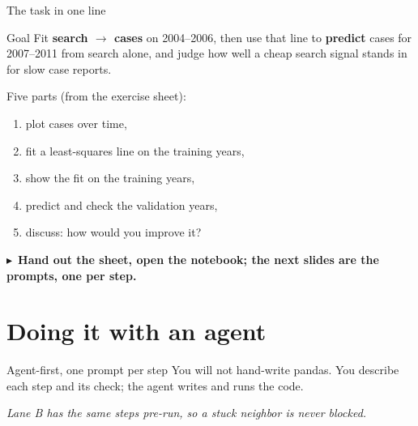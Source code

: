 \documentclass[aspectratio=169,11pt]{beamer}
\newcommand{\tonb}[1]{\vspace{0.1em}\begin{flushright}\footnotesize\textcolor{AccentB}{$\blacktriangleright$~\textbf{#1}}\end{flushright}}
\begin{document}
\begin{frame}{The task in one line}
  \begin{block}{Goal}
    Fit \textbf{search $\rightarrow$ cases} on 2004--2006, then use that line to
    \textbf{predict} cases for 2007--2011 from search alone, and judge how well a cheap
    search signal stands in for slow case reports.
  \end{block}
  \vspace{0.5em}
  Five parts (from the exercise sheet):
  \begin{enumerate}
    \item plot cases over time,
    \item fit a least-squares line on the training years,
    \item show the fit on the training years,
    \item predict and check the validation years,
    \item discuss: how would you improve it?
  \end{enumerate}
  \tonb{Hand out the sheet, open the notebook; the next slides are the prompts, one per step.}
\end{frame}

\section{Doing it with an agent}

\begin{frame}{Agent-first, one prompt per step}
  You will not hand-write pandas. You describe each step and its check; the agent writes
  and runs the code.
  \begin{center}
  \end{center}
  \vspace{0.3em}
  \begin{center}
    \itshape Lane B has the same steps pre-run, so a stuck neighbor is never blocked.
  \end{center}
\end{frame}
\end{document}
